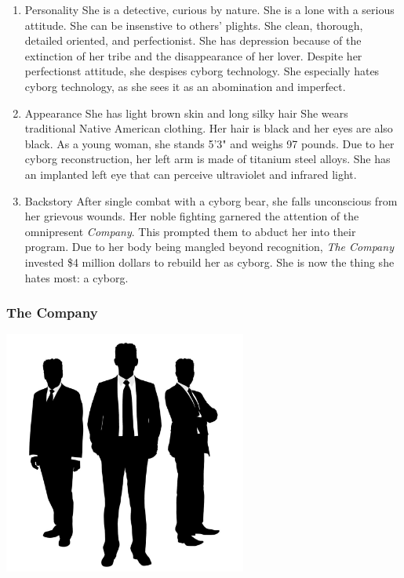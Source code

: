 \documentclass[11pt]{article}
\begin{document}
\begin{enumerate}
\item Personality
\label{sec:org4008d6f}
She is a detective, curious by nature. She is a lone with a serious attitude. She can be insenstive to others' plights. She clean, thorough, detailed oriented, and perfectionist. She has depression because of the extinction of her tribe and the disappearance of her lover. Despite her perfectionst attitude, she despises cyborg technology. She especially hates cyborg technology, as she sees it as an abomination and imperfect.

\item Appearance
\label{sec:org1b79faf}
She has light brown skin and long silky hair She wears traditional Native American clothing. Her hair is black and her eyes are also black. As a young woman, she stands 5'3" and weighs 97 pounds. Due to her cyborg reconstruction, her left arm is made of titanium steel alloys. She has an implanted left eye that can perceive ultraviolet and infrared light.

\item Backstory
\label{sec:orgf6ee348}
After single combat with a cyborg bear, she falls unconscious from her grievous wounds. Her noble fighting garnered the attention of the omnipresent \emph{Company}. This prompted them to abduct her into their program. Due to her body being mangled beyond recognition, \emph{The Company} invested \$4 million dollars to rebuild her as cyborg. She is now the thing she hates most: a cyborg.
\end{enumerate}

\subsubsection{The Company}
\label{sec:orgdb1905e}
\begin{center}
\includegraphics[width=8cm]{./img/the-company.png}
\end{center}
\end{document}
